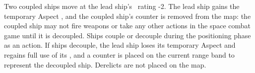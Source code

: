 Two coupled ships move at the lead ship's \Vshift\ rating -2. The lead ship gains the temporary Aspect , and the coupled ship's counter is removed from the map: the coupled ship may not fire weapons or take any other actions in the space combat game until it is decoupled. Ships couple or decouple during the positioning phase as an action. If ships decouple, the lead ship loses its temporary Aspect and regains full use of its \Vshift, and a counter is placed on the current range band to represent the decoupled ship. Derelicts are not placed on the map.

